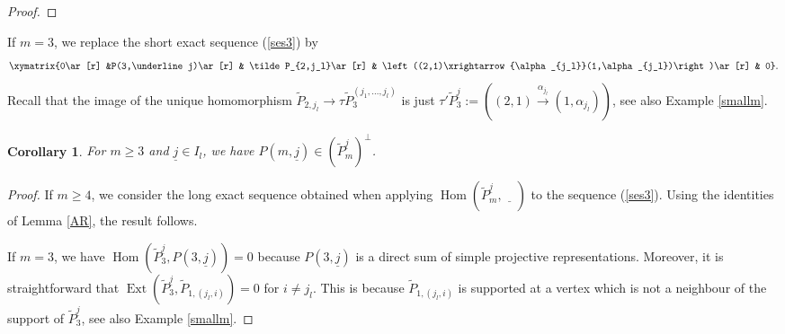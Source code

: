 \documentclass{amsart}
\newtheorem{corollary}[theorem]{Corollary}
\newcommand{\uj}{\underline j}
\newcommand{\kk}{\Bbbk}
\newcommand{\Ext}{\operatorname{Ext}}
\newcommand{\Hom}{\operatorname{Hom}}
\begin{document}
\begin{proof}



\end{proof}



If $m=3$, we replace the short exact sequence (\ref{ses3}) by
 \begin{align}
   \label{ses4}
   \xymatrix{0\ar[r] &P(3,\uj)\ar[r] &  \tilde P_{2,j_l}\ar[r] & \left((2,1)\xrightarrow{\alpha_{j_l}}(1,\alpha_{j_l})\right)\ar[r] & 0}.
 \end{align}
 Recall that the image of the unique homomorphism $\tilde P_{2,j_l}\to\tau\tilde P_{3}^{(j_1,\ldots,j_l)}$ is just $\tau'\tilde P_3^{\uj}:=\left((2,1)\xrightarrow{\alpha_{j_l}}(1,\alpha_{j_l})\right)$, see also Example \ref{smallm}. 

\begin{corollary}\label{cor: perpendicular}
For $m\geq 3$ and $\uj\in I_l$, we have $P(m,\uj)\in (\tilde P_{m}^{\uj})^\perp$.
\end{corollary}
\begin{proof}
If $m\geq 4$, we consider the long exact sequence obtained when applying $\Hom(\tilde P_{m}^{\uj},\underline{\quad})$ to the sequence (\ref{ses3}). Using the identities of Lemma \ref{AR}, the result follows.

If $m=3$, we have $\Hom(\tilde P_{3}^{\uj},P(3,\uj))=0$ because $P(3,\uj)$ is a direct sum of simple projective representations. Moreover, it is straightforward that 
$\Ext(\tilde P_{3}^{\uj},\tilde P_{1,(j_l,i)})=0$ for $i\neq j_l$. This is because $\tilde P_{1,(j_l,i)}$ is supported at a  vertex which is not a neighbour of the support of $\tilde P_{3}^{\uj}$, see also Example  \ref{smallm}.

\end{proof}
\end{document}
